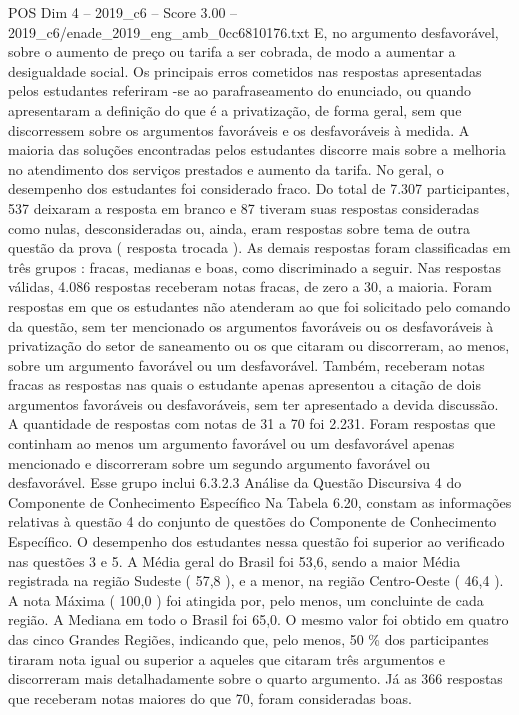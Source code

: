 \begin{textsample}{POS Dim 4 – 2019\_c6 – Score 3.00 – 2019\_c6/enade\_2019\_eng\_amb\_0cc6810176.txt}
E, no argumento desfavorável, sobre o aumento de preço ou tarifa a ser cobrada, de modo a aumentar a desigualdade social.
Os principais erros cometidos nas respostas apresentadas pelos estudantes referiram -se ao parafraseamento do enunciado, ou quando apresentaram a definição do que é a privatização, de forma geral, sem que discorressem sobre os argumentos favoráveis e os desfavoráveis à medida.
A maioria das soluções encontradas pelos estudantes discorre mais sobre a melhoria no atendimento dos serviços prestados e aumento da tarifa.
No geral, o desempenho dos estudantes foi considerado fraco.
Do total de 7.307 participantes, 537 deixaram a resposta em branco e 87 tiveram suas respostas consideradas como nulas, desconsideradas ou, ainda, eram respostas sobre tema de outra questão da prova ( resposta trocada ).
As demais respostas foram classificadas em três grupos : fracas, medianas e boas, como discriminado a seguir.
Nas respostas válidas, 4.086 respostas receberam notas fracas, de zero a 30, a maioria.
Foram respostas em que os estudantes não atenderam ao que foi solicitado pelo comando da questão, sem ter mencionado os argumentos favoráveis ou os desfavoráveis à privatização do setor de saneamento ou os que citaram ou discorreram, ao menos, sobre um argumento favorável ou um desfavorável.
Também, receberam notas fracas as respostas nas quais o estudante apenas apresentou a citação de dois argumentos favoráveis ou desfavoráveis, sem ter apresentado a devida discussão.
A quantidade de respostas com notas de 31 a 70 foi 2.231.
Foram respostas que continham ao menos um argumento favorável ou um desfavorável apenas mencionado e discorreram sobre um segundo argumento favorável ou desfavorável.
Esse grupo inclui 6.3.2.3 Análise da Questão Discursiva 4 do Componente de Conhecimento Específico Na Tabela 6.20, constam as informações relativas à questão 4 do conjunto de questões do Componente de Conhecimento Específico.
O desempenho dos estudantes nessa questão foi superior ao verificado nas questões 3 e 5.
A Média geral do Brasil foi 53,6, sendo a maior Média registrada na região Sudeste ( 57,8 ), e a menor, na região Centro-Oeste ( 46,4 ).
A nota Máxima ( 100,0 ) foi atingida por, pelo menos, um concluinte de cada região.
A Mediana em todo o Brasil foi 65,0.
O mesmo valor foi obtido em quatro das cinco Grandes Regiões, indicando que, pelo menos, 50 \% dos participantes tiraram nota igual ou superior a aqueles que citaram três argumentos e discorreram mais detalhadamente sobre o quarto argumento.
Já as 366 respostas que receberam notas maiores do que 70, foram consideradas boas.

\end{textsample}

